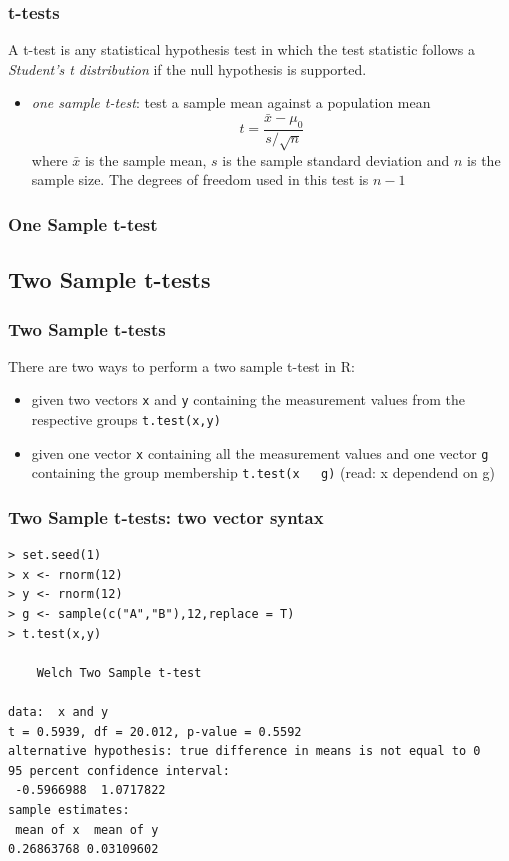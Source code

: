 \documentclass[xcolor={table}]{beamer}
\begin{document}
\begin{frame}[fragile]\frametitle{t-tests}
A t-test is any statistical hypothesis test in which the test statistic follows a \emph{Student's t distribution} if the null hypothesis is supported.
\begin{itemize}
\item \emph{one sample t-test}: test a sample mean against a population mean
$$ t = \frac{\bar{x}-\mu_0}{s/\sqrt{n}}$$ where $\bar{x}$ is the sample mean, $s$ is the sample standard deviation and $n$ is the sample size. The degrees of freedom used in this test is $n-1$
\end{itemize}
\end{frame}

\begin{frame}[fragile]\frametitle{One Sample t-test}
\end{frame}


\subsection{Two Sample t-tests}


\begin{frame}[fragile]\frametitle{Two Sample t-tests}
There are two ways to perform a two sample t-test in R:
\begin{itemize}
\item given two vectors \texttt{x} and \texttt{y} containing the measurement values from the respective groups \texttt{t.test(x,y)}
\item given one vector \texttt{x} containing all the measurement values and one vector \texttt{g} containing the group membership \texttt{t.test(x ~ g)} (read: x dependend on g)
\end{itemize}
\end{frame}

\begin{frame}[fragile]\frametitle{Two Sample t-tests: two vector syntax}\footnotesize
\begin{verbatim}
> set.seed(1)
> x <- rnorm(12)
> y <- rnorm(12)
> g <- sample(c("A","B"),12,replace = T)
> t.test(x,y)

	Welch Two Sample t-test

data:  x and y
t = 0.5939, df = 20.012, p-value = 0.5592
alternative hypothesis: true difference in means is not equal to 0
95 percent confidence interval:
 -0.5966988  1.0717822
sample estimates:
 mean of x  mean of y 
0.26863768 0.03109602   
\end{verbatim}
\end{frame}
\end{document}
